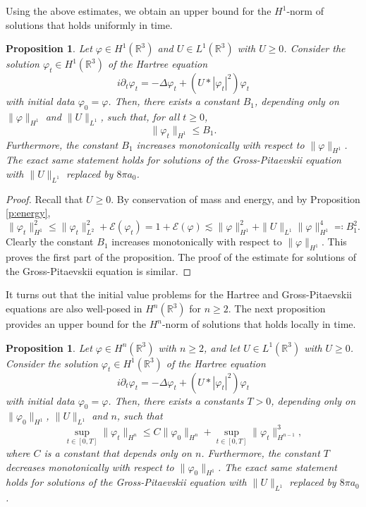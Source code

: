\documentclass[11pt,a4paper,DIV11]{scrartcl}	%
\newtheorem{prp}[thm]{Proposition}
\newcommand{\R}{\mathds{R}}
\newcommand{\norm}[1]{\lVert#1\rVert}	%
\begin{document}
Using the above estimates, we obtain an upper bound for the $H^1$-norm of
solutions that holds uniformly in time.


\begin{prp} \label{p:reg1}
  Let $\varphi \in H^1(\R^3)$ and $U \in L^1(\R^3)$ with $U \ge 0$. Consider
  the solution $\varphi_t \in H^1(\R^3)$ of the Hartree equation
  \[
    i \partial_t \varphi_t = - \Delta \varphi_t + (U * |\varphi_t|^2)
    \varphi_t
  \]
  with initial data $\varphi_0 = \varphi$. Then, there exists a constant
  $B_1$, depending only on $\| \varphi \|_{H^1}$ and $\| U \|_{L^1}$, such
  that, for all $t \geq 0$,
  \[
    \norm{\varphi_t}_{H^1} \leq B_1. 
  \]
  Furthermore, the constant $B_1$ increases monotonically with respect to
  $\| \varphi \|_{H^1}$. The exact same statement holds for solutions of the
  Gross-Pitaevskii equation with $\| U \|_{L^1}$ replaced by $8 \pi a_0$.
\end{prp}


\begin{proof}
  Recall that $U \ge 0$. By conservation of mass and energy, and by
  Proposition \ref{p:energy},
  \[
    \| \varphi_t \|_{H^1}^2 \le \| \varphi_t \|_{L^2}^2 +
    \mathcal{E}(\varphi_t) = 1 + \mathcal{E}(\varphi) \apprle \| \varphi
    \|_{H^1}^2 + \| U \|_{L^1} \| \varphi \|_{H^1}^4 \eqqcolon B_1^2.
  \]
  Clearly the constant $B_1$ increases monotonically with respect to $\|
  \varphi \|_{H^1}$. This proves the first part of the proposition. The
  proof of the estimate for solutions of the Gross-Pitaevskii equation is
  similar.
\end{proof}


It turns out that the initial value problems for the Hartree and
Gross-Pitaevskii equations are also well-posed in $H^n(\R^3)$ for $n \ge 2$.
The next proposition provides an upper bound for the $H^n$-norm of solutions
that holds locally in time.


\begin{prp} \label{p:lregn}
  Let $\varphi \in H^n(\R^3)$ with $n \geq 2$, and let $U \in L^1(\R^3)$
  with $U \ge 0$. Consider the solution $\varphi_t \in H^1(\R^3)$ of the
  Hartree equation
  \[
    i \partial_t \varphi_t = - \Delta \varphi_t + (U * |\varphi_t|^2)
    \varphi_t
  \]
  with initial data $\varphi_0 = \varphi$. Then, there exists a constants $T
  > 0$, depending only on $\| \varphi_0 \|_{H^1}$, $\| U \|_{L^1}$ and $n$,
  such that
  \begin{equation}\label{eq:preregularity}
    \sup_{t \in [0,T]} \| \varphi_t \|_{H^n} \le C \| \varphi_0 \|_{H^n} +
    \sup_{t \in [0,T]} \| \varphi_t \|_{H^{n-1}}^3,
  \end{equation}
  where $C$ is a constant that depends only on $n$. Furthermore, the
  constant $T$ decreases monotonically with respect to $\| \varphi_0
  \|_{H^1}$. The exact same statement holds for solutions of the
  Gross-Pitaevskii equation with $\| U \|_{L^1}$ replaced by $8 \pi a_0$.
\end{prp}
\end{document}

